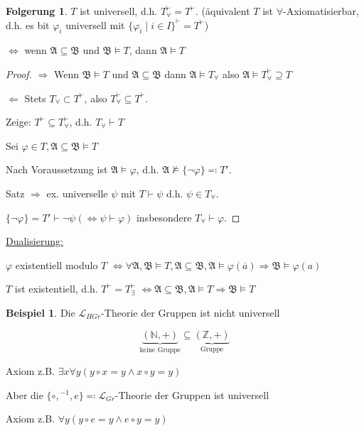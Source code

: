 \documentclass[12pt,parskip=full]{scrartcl}
\newcommand{\setN}{\mathbb{N}}
\newcommand{\setZ}{\mathbb{Z}}
\newcommand{\heading}{\underline}
\theoremstyle{definition}
\newtheorem{corollary}[theorem]{Folgerung}
\newtheorem{example}[theorem]{Beispiel}
\begin{document}
	\begin{corollary}
		$T$ ist universell, d.h. $T_\forall^\vdash = T^\vdash$. (äquivalent $T$ ist $\forall$-Axiomatisierbar, d.h. es bit $\varphi_i$ universell mit $\{ \varphi_i \mid i \in I \}^\vdash = T^\vdash$)
		
		$\Leftrightarrow$ wenn $\mathfrak{A} \subseteq \mathfrak{B}$ und $\mathfrak{B} \models T$, dann $\mathfrak{A} \models T$
	\end{corollary}
	\begin{proof}
		\heading{$\Rightarrow$} Wenn $\mathfrak{B} \models T$ und $\mathfrak{A} \subseteq \mathfrak{B}$ dann $\mathfrak{A} \models T_\forall$ also $\mathfrak{A} \models T_\forall^\vdash \supseteq T$
		
		\heading{$\Leftarrow$} Stets $T_\forall \subset T^\vdash$, also $T_\forall^\vdash \subseteq T^\vdash$.
		
		Zeige: $T^\vdash \subseteq T_\forall^\vdash$, d.h. $T_\forall \vdash T$
		
		Sei $\varphi \in T, \mathfrak{A} \subseteq \mathfrak{B} \models T$
		
		Nach Voraussetzung ist $\mathfrak{A} \models \varphi$, d.h. $\mathfrak{A} \not\models \{ \lnot \varphi \} \eqqcolon T'$.
		
		Satz $\Rightarrow$ ex. universelle $\psi$ mit $T \vdash \psi$ d.h. $\psi \in T_\forall$.
		
		$\{ \lnot \varphi \} = T' \vdash \lnot \psi (\Leftrightarrow \psi \vdash \varphi)$ insbesondere $T_\forall \vdash \varphi$.
	\end{proof}

	\heading{Dualisierung:}
	
	$\varphi$ existentiell modulo $T$ $\Leftrightarrow \forall \mathfrak{A}, \mathfrak{B} \models T, \mathfrak{A} \subseteq \mathfrak{B}, \mathfrak{A} \models \varphi(\overline{a}) \Rightarrow \mathfrak{B} \models \varphi(a)$
	
	$T$ ist existentiell, d.h. $T^\vdash = T_\exists^\vdash$ $\Leftrightarrow \mathfrak{A} \subseteq \mathfrak{B}, \mathfrak{A} \models T \Rightarrow \mathfrak{B} \models T$
	
	\begin{example}
		Die $\mathcal{L}_{HGr}$-Theorie der Gruppen ist nicht universell
		
		\begin{equation*}
			\underbrace{(\setN, +)}_\text{keine Gruppe} \subseteq \underbrace{(\setZ, +)}_\text{Gruppe}
		\end{equation*}
		
		Axiom z.B. $\exists x \forall y (y \circ x = y \land x \circ y = y)$
		
		Aber die $\{ \circ, {}^{-1}, e \} \eqqcolon \mathcal{L}_{Gr}$-Theorie der Gruppen ist universell
		
		Axiom z.B. $\forall y (y \circ e = y \land e \circ y = y)$
	\end{example}
	
\end{document}
